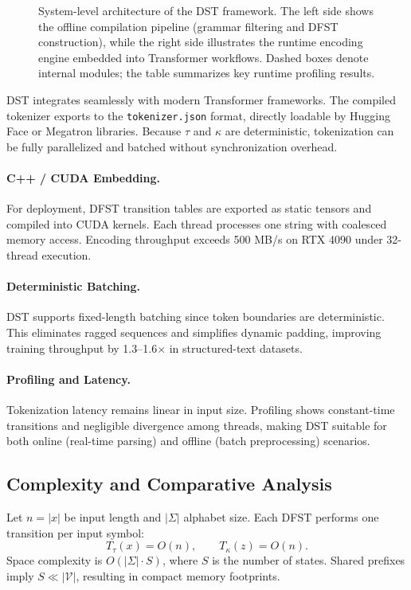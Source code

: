 \begin{figure*}[t]
\caption{System-level architecture of the DST framework.
The left side shows the offline compilation pipeline (grammar filtering and DFST construction),
while the right side illustrates the runtime encoding engine embedded into Transformer workflows.
Dashed boxes denote internal modules; the table summarizes key runtime profiling results.}
\label{fig:dst_architecture}
\end{figure*}

DST integrates seamlessly with modern Transformer frameworks.
The compiled tokenizer exports to the \texttt{tokenizer.json} format, directly loadable by Hugging Face or Megatron libraries.
Because $\tau$ and $\kappa$ are deterministic, tokenization can be fully parallelized and batched without synchronization overhead.

\paragraph{C++ / CUDA Embedding.}
For deployment, DFST transition tables are exported as static tensors and compiled into CUDA kernels.
Each thread processes one string with coalesced memory access.
Encoding throughput exceeds 500 MB/s on RTX 4090 under 32-thread execution.

\paragraph{Deterministic Batching.}
DST supports fixed-length batching since token boundaries are deterministic.
This eliminates ragged sequences and simplifies dynamic padding, improving training throughput by 1.3–1.6$\times$ in structured-text datasets.

\paragraph{Profiling and Latency.}
Tokenization latency remains linear in input size.
Profiling shows constant-time transitions and negligible divergence among threads, making DST suitable for both online (real-time parsing) and offline (batch preprocessing) scenarios.

\subsection{Complexity and Comparative Analysis}
Let $n=|x|$ be input length and $|\Sigma|$ alphabet size.
Each DFST performs one transition per input symbol:
\[
T_\tau(x)=O(n), \qquad T_\kappa(z)=O(n).
\]
Space complexity is $O(|\Sigma|\!\cdot\!S)$, where $S$ is the number of states.
Shared prefixes imply $S\!\ll\!|\mathcal{V}|$, resulting in compact memory footprints.

